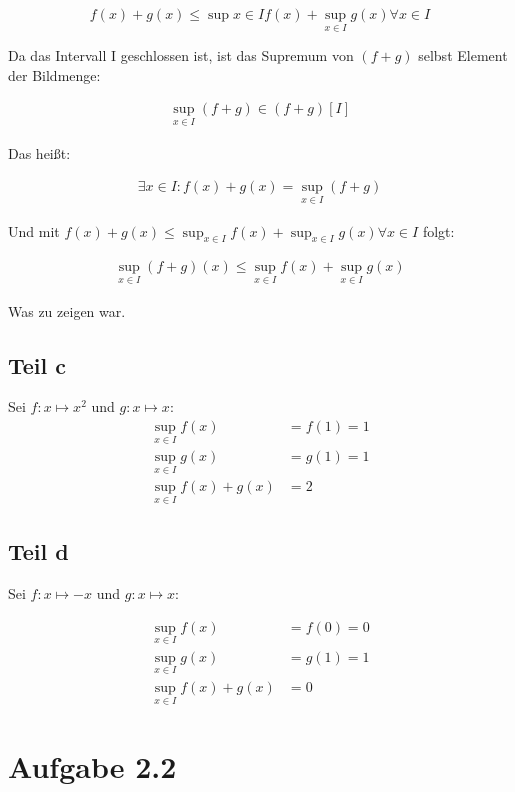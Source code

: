 \documentclass[a4paper,german,12pt,smallheadings]{scrartcl}
\begin{document}
\begin{equation*}
  f(x) + g(x) \le \sup{x \in I} f(x) + \sup_{x \in I} g(x) \forall x \in I
\end{equation*}

Da das Intervall I geschlossen ist, ist das Supremum von $(f+g)$ selbst Element der Bildmenge:

\begin{align*}
  \sup_{x \in I} (f+g) \in (f+g)[I]
\end{align*}

Das heißt:

\begin{align*}
  \exists x \in I: f(x) + g(x) = \sup_{x \in I} (f+g)
\end{align*}

Und mit $f(x)+g(x) \le \sup_{x \in I} f(x) + \sup_{x \in I} g(x) \forall x \in I$ folgt:

\begin{align*}
  \sup_{x \in I} (f+g)(x) \le \sup_{x \in I} f(x) + \sup_{x \in I} g(x)
\end{align*}

Was zu zeigen war.

\subsection*{Teil c}
Sei $f: x \mapsto x^2$ und $g: x \mapsto x$:
\begin{align*}
  \sup_{x \in I} f(x) &= f(1) = 1 \\
  \sup_{x \in I} g(x) &= g(1) = 1 \\
  \sup_{x \in I} f(x) + g(x) &= 2
\end{align*}

\subsection*{Teil d}
Sei $f: x \mapsto -x$ und $g: x \mapsto x$:

\begin{align*}
  \sup_{x \in I} f(x) &= f(0) = 0 \\
  \sup_{x \in I} g(x) &= g(1) = 1 \\
  \sup_{x \in I} f(x) + g(x) &= 0
\end{align*}

\section*{Aufgabe 2.2}
\end{document}
